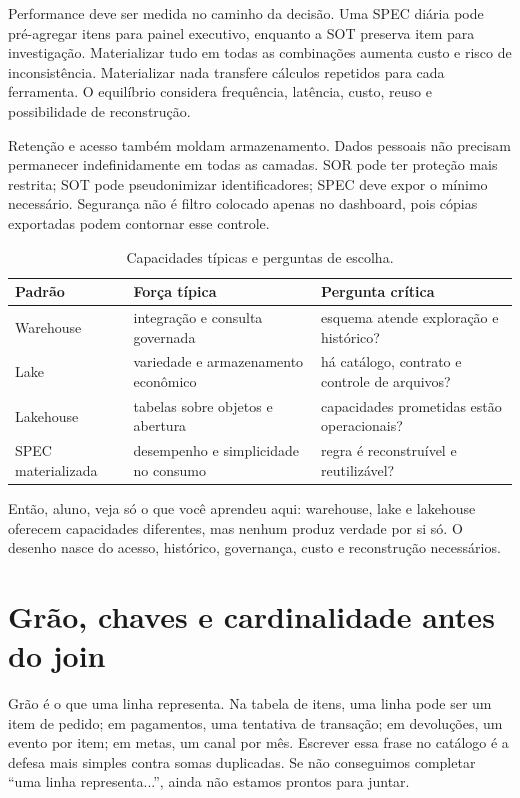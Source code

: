 Performance deve ser medida no caminho da decisão. Uma SPEC diária pode pré-agregar itens para painel executivo, enquanto a SOT preserva item para investigação. Materializar tudo em todas as combinações aumenta custo e risco de inconsistência. Materializar nada transfere cálculos repetidos para cada ferramenta. O equilíbrio considera frequência, latência, custo, reuso e possibilidade de reconstrução.

Retenção e acesso também moldam armazenamento. Dados pessoais não precisam permanecer indefinidamente em todas as camadas. SOR pode ter proteção mais restrita; SOT pode pseudonimizar identificadores; SPEC deve expor o mínimo necessário. Segurança não é filtro colocado apenas no dashboard, pois cópias exportadas podem contornar esse controle.

\begin{table}[htbp]
\centering
\small
\caption{Capacidades típicas e perguntas de escolha.}
\label{tab:armazenamento}
\begin{tabularx}{0.95\textwidth}{@{}p{2.4cm}YY@{}}
\toprule
\textbf{Padrão} & \textbf{Força típica} & \textbf{Pergunta crítica} \\
\midrule
Warehouse & integração e consulta governada & esquema atende exploração e histórico? \\
Lake & variedade e armazenamento econômico & há catálogo, contrato e controle de arquivos? \\
Lakehouse & tabelas sobre objetos e abertura & capacidades prometidas estão operacionais? \\
SPEC materializada & desempenho e simplicidade no consumo & regra é reconstruível e reutilizável? \\
\bottomrule
\end{tabularx}
\end{table}

\begin{SummaryBox}
Então, aluno, veja só o que você aprendeu aqui: warehouse, lake e lakehouse oferecem capacidades diferentes, mas nenhum produz verdade por si só. O desenho nasce do acesso, histórico, governança, custo e reconstrução necessários.
\end{SummaryBox}

\section{Grão, chaves e cardinalidade antes do join}

Grão é o que uma linha representa. Na tabela de itens, uma linha pode ser um item de pedido; em pagamentos, uma tentativa de transação; em devoluções, um evento por item; em metas, um canal por mês. Escrever essa frase no catálogo é a defesa mais simples contra somas duplicadas. Se não conseguimos completar ``uma linha representa...'', ainda não estamos prontos para juntar.

